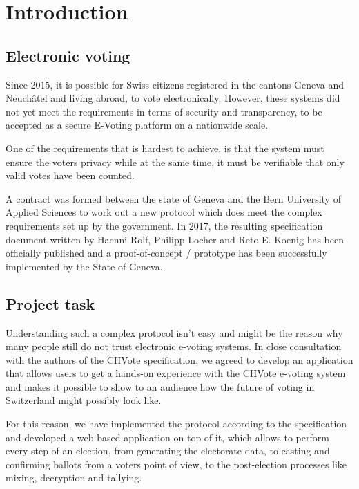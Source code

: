 \chapter{Introduction}
\section{Electronic voting}
Since 2015, it is possible for Swiss citizens registered in the cantons Geneva and Neuchâtel and living abroad, to vote electronically. However, these systems did not yet meet the requirements in terms of security and transparency, to be accepted as a secure E-Voting platform on a nationwide scale.

One of the requirements that is hardest to achieve, is that the system must ensure the voters privacy while at the same time, it must be verifiable that only valid votes have been counted.

A contract was formed between the state of Geneva and the Bern University of Applied Sciences to work out a new protocol which does meet the complex requirements set up by the government. In 2017, the resulting specification document written by Haenni Rolf, Philipp Locher and Reto E. Koenig has been officially published and a proof-of-concept / prototype has been successfully implemented by the State of Geneva. 

\section{Project task}

Understanding such a complex protocol isn't easy and might be the reason why many people still do not trust electronic e-voting systems. In close consultation with the authors of the CHVote specification, we agreed to develop an application that allows users to get a hands-on experience with the CHVote e-voting system and makes it possible to show to an audience how the future of voting in Switzerland might possibly look like.

For this reason, we have implemented the protocol according to the specification and developed a web-based application on top of it, which allows to perform every step of an election, from generating the electorate data, to casting and confirming ballots from a voters point of view, to the post-election processes like mixing, decryption and tallying.
